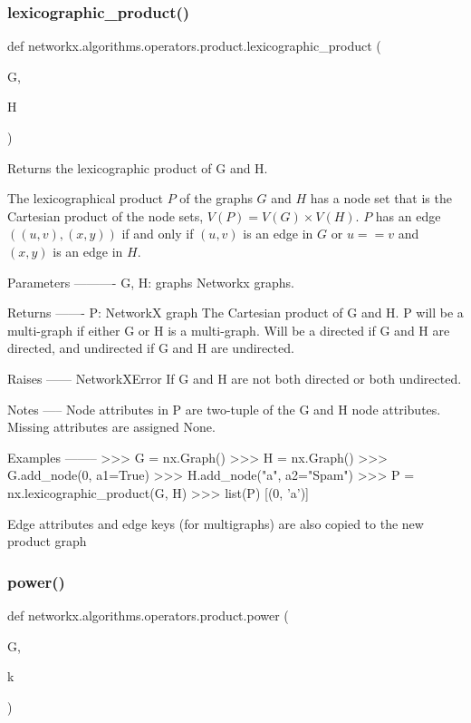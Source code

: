 \subsubsection{\texorpdfstring{lexicographic\+\_\+product()}{lexicographic\_product()}}
{\footnotesize\ttfamily def networkx.\+algorithms.\+operators.\+product.\+lexicographic\+\_\+product (\begin{DoxyParamCaption}\item[{}]{G,  }\item[{}]{H }\end{DoxyParamCaption})}

\begin{DoxyVerb}Returns the lexicographic product of G and H.

The lexicographical product $P$ of the graphs $G$ and $H$ has a node set
that is the Cartesian product of the node sets, $V(P)=V(G) \times V(H)$.
$P$ has an edge $((u,v), (x,y))$ if and only if $(u,v)$ is an edge in $G$
or $u==v$ and $(x,y)$ is an edge in $H$.

Parameters
----------
G, H: graphs
 Networkx graphs.

Returns
-------
P: NetworkX graph
 The Cartesian product of G and H. P will be a multi-graph if either G
 or H is a multi-graph. Will be a directed if G and H are directed,
 and undirected if G and H are undirected.

Raises
------
NetworkXError
 If G and H are not both directed or both undirected.

Notes
-----
Node attributes in P are two-tuple of the G and H node attributes.
Missing attributes are assigned None.

Examples
--------
>>> G = nx.Graph()
>>> H = nx.Graph()
>>> G.add_node(0, a1=True)
>>> H.add_node("a", a2="Spam")
>>> P = nx.lexicographic_product(G, H)
>>> list(P)
[(0, 'a')]

Edge attributes and edge keys (for multigraphs) are also copied to the
new product graph
\end{DoxyVerb}
 \mbox{\label{namespacenetworkx_1_1algorithms_1_1operators_1_1product_a3402ece922a3078e26ce290eed5b5efc}} 
\subsubsection{\texorpdfstring{power()}{power()}}
{\footnotesize\ttfamily def networkx.\+algorithms.\+operators.\+product.\+power (\begin{DoxyParamCaption}\item[{}]{G,  }\item[{}]{k }\end{DoxyParamCaption})}

